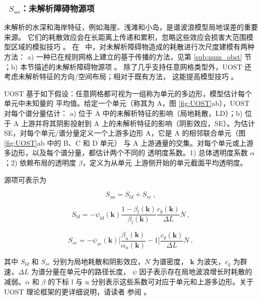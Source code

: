 \vsssub
\subsubsection{~$S_{uo}$：未解析障碍物源项} \label{sec:UOST}
\vsssub


未解析的水深和海岸特征，例如海崖、浅滩和小岛，是谱波浪模型局地误差的重要来源。
它们的耗散效应会在长距离上传递和累积，忽略这些效应会损害大范围模型区域的模拟技巧
\citep{tol:Waves01a,tol:WaF02,art:Tuomi2014,art:Mentaschi2015a}。
在 \ws\ 中，对未解析障碍物造成的耗散进行次尺度建模有两种方法：
a) 一种已在规则网格上建立的基于传播的方法，见第 \ref{sub:num_obst} 节
\citep{tol:OMOD03a, tol:OMOD08a}；b) 本节描述的未解析障碍物源项
\citep[UOST,][]{art:Mentaschi2018a,art:Mentaschi2015b}。
除了几乎支持任意网格类型外，UOST 还考虑未解析特征的方向/空间布局；相对于既有方法，
这能提高模型技巧 \citep{art:HMM00,art:Mentaschi2018b}。

UOST 基于如下假设：任意网格都可视为一组称为单元的多边形，模型估计每个单元中未知量的
平均值。给定一个单元（称其为 A，图 \ref{fig:UOST}ab），UOST 对每个谱分量估计：
a) 位于 A 中的未解析特征的影响（局地耗散，LD）；b) 位于 A 上游并将其阴影投射到 A
上的未解析特征的影响（阴影效应，SE）。为估计 SE，对每个单元/谱分量定义一个上游多边形
A\textsc{}，它是 A 的相邻联合单元（图 \ref{fig:UOST}ab 中的 B、C 和 D 单元）
与 A 上游通量的交集。对每个单元或上游多边形，以及每个谱分量，都估计两个不同的
透明度系数。1) 总体透明度系数 $\alpha$；2) 依赖布局的透明度 $\beta$，定义为从单元
上游侧开始的单元截面平均透明度。

源项可表示为

\begin{equation}
S_{uo} = S_{ld} + S_{se}\ ,
\end{equation}

\begin{equation}
S_{ld} = - \psi_{ld}(\mathbf{k}) \frac{1 - \beta_l(\mathbf{k})}{\beta_l(\mathbf{k})} \frac{c_g(\mathbf{k})}{\Delta L} N \ ,
\end{equation}

\begin{equation}
S_{se} = - \psi_{se}(\mathbf{k}) \bigg[ \frac{\beta_u(\mathbf{k})}{\alpha_u(\mathbf{k})} - 1 \bigg] \frac{c_g(\mathbf{k})}{\Delta L} N \ ,
\end{equation}

其中 $S_{ld}$ 和 $S_{se}$ 分别为局地耗散和阴影效应，$N$ 为谱密度，
$\mathbf{k}$ 为波矢，$c_g$ 为群速，$\Delta L$ 为谱分量在单元中的路径长度，
$\psi$ 因子表示存在局地波浪增长时耗散的减弱。$\alpha$ 和 $\beta$ 的下标 l 与 u
分别表示这些系数可对应于单元和上游多边形。关于 UOST 理论框架的更详细说明，请读者
参阅 \citep{art:Mentaschi2015b, art:Mentaschi2018a}。

